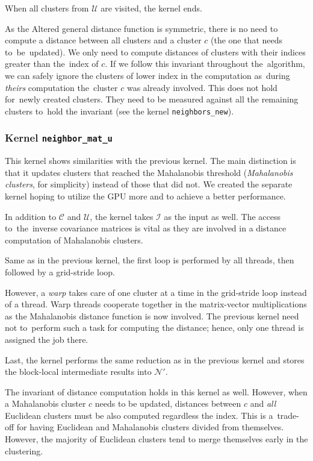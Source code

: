 When all clusters from $\mathcal{U}$ are visited, the kernel ends.

\begin{rem}
	As the Altered general distance function is symmetric, there is no need to compute a distance between all clusters and a cluster $c$ (the one that needs to~be~updated). We only need to compute distances of clusters with their indices greater than the~index of $c$. If we follow this invariant throughout the~algorithm, we can safely ignore the clusters of lower index in the computation as~during \emph{theirs} computation the~cluster $c$ was already involved. This does not hold for~newly created clusters. They need to be measured against all the remaining clusters to~hold the invariant (see the kernel \texttt{neighbors\_new}).
\end{rem}

\subsubsection{Kernel \texttt{neighbor\_mat\_u}} This kernel shows similarities with the previous kernel. The main distinction is that it updates clusters that reached the Mahalanobis threshold (\emph{Mahalanobis clusters}, for simplicity) instead of those that did not. We created the separate kernel hoping to utilize the GPU more and to achieve a better performance.

In addition to $\mathcal{C}$ and $\mathcal{U}$, the kernel takes $\mathcal{I}$ as the input as well. The access to~the~inverse covariance matrices is vital as they are involved in a distance computation of Mahalanobis clusters. 

Same as in the previous kernel, the first loop is performed by all threads, then followed by a grid-stride loop. 

However, a \emph{warp} takes care of one cluster at a time in the grid-stride loop instead of a thread. Warp threads cooperate together in the matrix-vector multiplications as the Mahalanobis distance function is now involved. The previous kernel need not to~perform such a task for computing the distance; hence, only one thread is assigned the job there.

Last, the kernel performs the same reduction as in the previous kernel and stores the block-local intermediate results into $\mathcal{N}'$.

\begin{rem}
	The invariant of distance computation holds in this kernel as well. However, when a Mahalanobis cluster $c$ needs to be updated, distances between $c$ and \emph{all} Euclidean clusters must be also computed regardless the index. This is a~trade-off for having Euclidean and Mahalanobis clusters divided from themselves. However, the majority of Euclidean clusters tend to merge themselves early in the clustering.
\end{rem}

